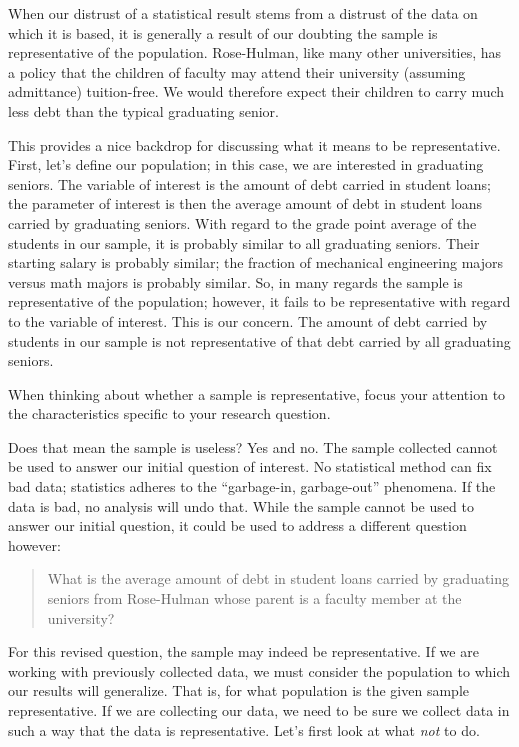 \documentclass[]{book}
\theoremstyle{definition}
\theoremstyle{definition}
\theoremstyle{definition}
\theoremstyle{remark}
\let\BeginKnitrBlock\begin \let\EndKnitrBlock\end
\begin{document}
When our distrust of a statistical result stems from a distrust of the
data on which it is based, it is generally a result of our doubting the
sample is representative of the population. Rose-Hulman, like many other
universities, has a policy that the children of faculty may attend their
university (assuming admittance) tuition-free. We would therefore expect
their children to carry much less debt than the typical graduating
senior.

This provides a nice backdrop for discussing what it means to be
representative. First, let's define our population; in this case, we are
interested in graduating seniors. The variable of interest is the amount
of debt carried in student loans; the parameter of interest is then the
average amount of debt in student loans carried by graduating seniors.
With regard to the grade point average of the students in our sample, it
is probably similar to all graduating seniors. Their starting salary is
probably similar; the fraction of mechanical engineering majors versus
math majors is probably similar. So, in many regards the sample is
representative of the population; however, it fails to be representative
with regard to the variable of interest. This is our concern. The amount
of debt carried by students in our sample is not representative of that
debt carried by all graduating seniors.

\BeginKnitrBlock{rmdtip}
When thinking about whether a sample is representative, focus your
attention to the characteristics specific to your research question.
\EndKnitrBlock{rmdtip}

Does that mean the sample is useless? Yes and no. The sample collected
cannot be used to answer our initial question of interest. No
statistical method can fix bad data; statistics adheres to the
``garbage-in, garbage-out'' phenomena. If the data is bad, no analysis
will undo that. While the sample cannot be used to answer our initial
question, it could be used to address a different question however:

\begin{quote}
What is the average amount of debt in student loans carried by
graduating seniors from Rose-Hulman whose parent is a faculty member at
the university?
\end{quote}

For this revised question, the sample may indeed be representative. If
we are working with previously collected data, we must consider the
population to which our results will generalize. That is, for what
population is the given sample representative. If we are collecting our
data, we need to be sure we collect data in such a way that the data is
representative. Let's first look at what \emph{not} to do.
\end{document}

